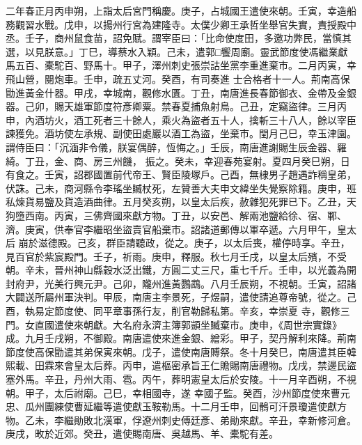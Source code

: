 \begin{pinyinscope}
 二年春正月丙申朔，上詣太后宮門稱慶。庚子，占城國王遣使來朝。壬寅，幸造船務觀習水戰。戊申，以揚州行宮為建隆寺。太僕少卿王承哲坐舉官失實，責授殿中丞。壬子，商州鼠食苗，詔免賦。謂宰臣曰：「比命使度田，多邀功弊民，當慎其選，以見朕意。」丁巳，導蔡水入穎。己未，遣郭□饗周廟。靈武節度使馮繼業獻馬五百、橐駝百、野馬十。甲子，澤州刺史張崇詁坐黨李重進棄市。二月丙寅，幸飛山營，閱炮車。壬申，疏五丈河。癸酉，有司奏進
 士合格者十一人。荊南高保勖進黃金什器。甲戌，幸城南，觀修水匱。丁丑，南唐進長春節御衣、金帶及金銀器。己卯，賜天雄軍節度符彥卿粟。禁春夏捕魚射鳥。己丑，定竊盜律。三月丙申，內酒坊火，酒工死者三十餘人，乘火為盜者五十人，擒斬三十八人，餘以宰臣諫獲免。酒坊使左承規、副使田處巖以酒工為盜，坐棄市。閏月己巳，幸玉津園。謂侍臣曰：「沉湎非令儀，朕宴偶醉，恆悔之。」壬辰，南唐進謝賜生辰金器、羅綺。丁丑，金、商、房三州饑，
 振之。癸未，幸迎春苑宴射。夏四月癸巳朔，日有食之。壬寅，詔郡國置前代帝王、賢臣陵塚戶。己酉，無棣男子趙遇詐稱皇弟，伏誅。己未，商河縣令李瑤坐贓杖死，左贊善大夫申文緯坐失覺察除籍。庚申，班私煉貨易鹽及貨造酒曲律。五月癸亥朔，以皇太后疾，赦雜犯死罪已下。乙丑，天狗墮西南。丙寅，三佛齊國來獻方物。丁丑，以安邑、解兩池鹽給徐、宿、鄆、濟。庚寅，供奉官李繼昭坐盜賣官船棄市。詔諸道郵傳以軍卒遞。六月甲午，皇太后
 崩於滋德殿。己亥，群臣請聽政，從之。庚子，以太后喪，權停時享。辛丑，見百官於紫宸殿門。壬子，祈雨。庚申，釋服。秋七月壬戌，以皇太后殯，不受朝。辛未，晉州神山縣穀水泛出鐵，方圓二丈三尺，重七千斤。壬申，以光義為開封府尹，光美行興元尹。己卯，隴州進黃鸚鵡。八月壬辰朔，不視朝。壬寅，詔諸大闢送所屬州軍決判。甲辰，南唐主李景死，子煜嗣，遣使請追尊帝號，從之。己酉，執易定節度使、同平章事孫行友，削官勒歸私第。辛亥，幸崇夏
 寺，觀修三門。女直國遣使來朝獻。大名府永濟主簿郭顗坐贓棄市。庚申，《周世宗實錄》成。九月壬戌朔，不御殿。南唐遣使來進金銀、繒彩。甲子，契丹解利來降。荊南節度使高保勖遣其弟保寅來朝。戊子，遣使南唐賻祭。冬十月癸巳，南唐遣其臣韓熙載、田霖來會皇太后葬。丙申，遣樞密承旨王仁贍賜南唐禮物。戊戌，禁邊民盜塞外馬。辛丑，丹州大雨、雹。丙午，葬明憲皇太后於安陵。十一月辛酉朔，不視朝。甲子，太后祔廟。己巳，幸相國寺，遂
 幸國子監。癸酉，沙州節度使來曹元忠、瓜州團練使曹延繼等遣使獻玉鞍勒馬。十二月壬申，回鶻可汗景瓊遣使獻方物。乙未，李繼勛敗北漢軍，俘遼州刺史傅廷彥、弟勛來獻。辛丑，幸新修河倉。庚戌，畋於近郊。癸丑，遣使賜南唐、吳越馬、羊、橐駝有差。




\end{pinyinscope}
